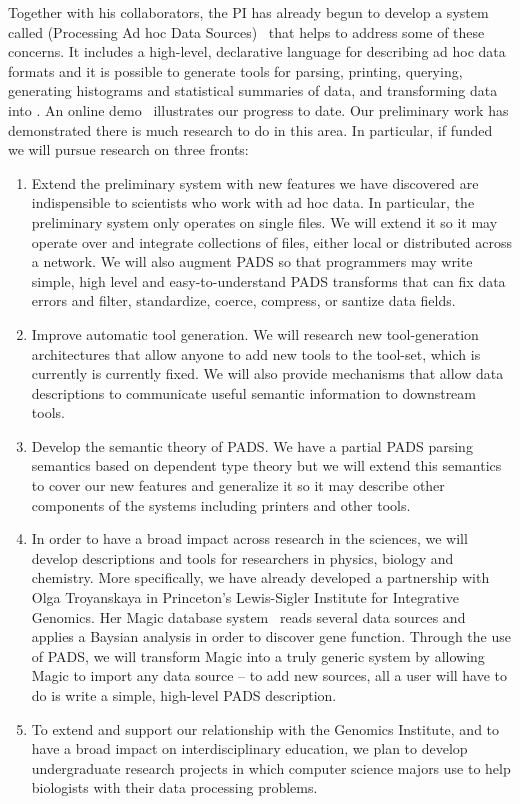 \documentclass[11pt]{article}
\begin{document}
Together with his collaborators, the PI has already 
begun to develop a system called \pads{} (Processing
Ad hoc Data Sources)~\cite{padsproj,fisher+:700,launchpads} that 
helps to address some of these concerns.
It includes a high-level, declarative language for describing
ad hoc data formats and it is possible to generate tools for
parsing, printing, querying, generating histograms and 
statistical summaries of data, and transforming 
data into \xml.  An online demo~\cite{padsproj} illustrates
our progress to date.
Our preliminary work has demonstrated
there is much research to do in this area.  In particular, if funded we 
will pursue research on three fronts:

\begin{enumerate}
\item Extend the preliminary system with new features we have discovered are indispensible to
scientists who work with ad hoc data.  In particular, the preliminary system only operates
on single files.  We will extend it so it may operate over and integrate collections of files,
either local or distributed across a network.  We will also augment PADS so that
programmers may write simple, high level and easy-to-understand PADS transforms that can fix data errors
and filter, standardize, coerce, compress, or santize data fields.
\item  Improve automatic tool generation.  We will research new tool-generation architectures
that allow anyone to add new tools to the tool-set, which is currently is currently fixed.
We will also provide mechanisms that allow data descriptions to communicate useful semantic information
to downstream tools.
\item Develop the semantic theory of PADS.  We have a partial PADS parsing semantics based on dependent type
theory but we will extend this semantics to cover our new features and generalize it so it may
describe other components of the systems including printers and other tools.
\item In order to have a broad impact across research in the sciences,
we will develop descriptions and tools for researchers in
physics, biology and chemistry.
More specifically, we have already developed a partnership with
Olga Troyanskaya in Princeton's Lewis-Sigler Institute for 
Integrative Genomics.  Her Magic database system~\cite{magic}
reads several data sources
and applies a Baysian analysis in order to discover gene function.
Through the use of PADS, we will transform Magic into a truly generic
system by allowing Magic to import any data source -- to add new sources,
all a user will have to do is write a simple, high-level PADS description.
\item To extend and support our relationship with the Genomics Institute,
and to have a broad impact on interdisciplinary education,
we plan to develop undergraduate research projects in which
computer science majors use \pads{} to help biologists 
with their data processing problems.  
\end{enumerate}
\end{document}
